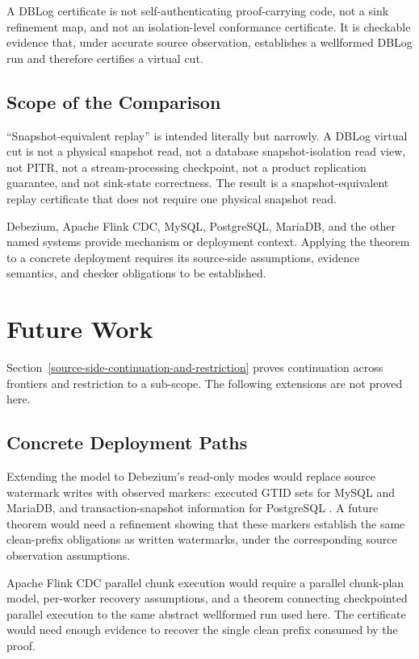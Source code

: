 \documentclass[letterpaper,10pt,twocolumn]{article}
\begin{document}
A DBLog certificate is not self-authenticating proof-carrying code, not
a sink refinement map, and not an isolation-level conformance
certificate. It is checkable evidence that, under accurate source
observation, establishes a wellformed DBLog run and therefore certifies a virtual
cut.

\subsection{Scope of the Comparison}\label{title-promise-and-product-claim-boundaries}

``Snapshot-equivalent replay'' is intended literally but narrowly. A
DBLog virtual cut is not a physical snapshot read, not a database
snapshot-isolation read view, not PITR, not a stream-processing
checkpoint, not a product replication guarantee, and not sink-state
correctness. The result is a snapshot-equivalent replay certificate that
does not require one physical snapshot read.

Debezium, Apache Flink CDC, MySQL, PostgreSQL, MariaDB, and the other
named systems provide mechanism or deployment context. Applying the
theorem to a concrete deployment requires its source-side assumptions,
evidence semantics, and checker obligations to be established.

\section{Future Work}\label{future-work}

Section~\ref{source-side-continuation-and-restriction} proves
continuation across frontiers and restriction to a sub-scope. The
following extensions are not proved here.

\subsection{Concrete Deployment
Paths}\label{sec:concrete-deployment-paths}

Extending the model to Debezium's read-only modes would replace source
watermark writes with observed markers: executed GTID sets for MySQL and
MariaDB, and transaction-snapshot information for PostgreSQL
\citep{debezium_read_only_snapshots}. A future theorem would need a
refinement showing that these markers establish the same clean-prefix
obligations as written watermarks, under the corresponding source
observation assumptions.

Apache Flink CDC parallel chunk execution would require a parallel
chunk-plan model, per-worker recovery assumptions, and a theorem
connecting checkpointed parallel execution to the same abstract
wellformed run used here. The certificate would need enough evidence to
recover the single clean prefix consumed by the proof.
\end{document}
